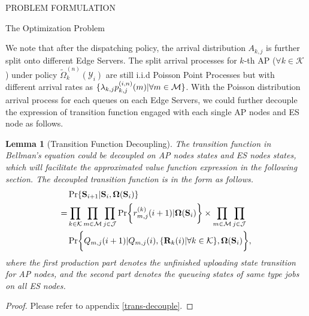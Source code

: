 \documentclass[10pt, conference, letterpaper]{IEEEtran}
\newtheorem{lemma}{Lemma}
\newcommand{\define}{\triangleq}
\newcommand{\vecG}{\boldsymbol}
\renewcommand{\vec}{\mathbf}
\DeclarePairedDelimiter{\set}{\{}{\}}
\DeclarePairedDelimiter{\Bracket}{\bigg[}{\bigg]}
\DeclarePairedDelimiter{\Brace}{\bigg\{}{\bigg\}}
\newcommand{\apSet}{\mathcal{K}}
\newcommand{\esSet}{\mathcal{M}}
\newcommand{\jSpace}{\mathcal{J}}
\newcommand{\Stat}{\mathbf{S}}
\newcommand{\Obsv}{\mathcal{Y}}
\newcommand{\Policy}{\boldsymbol{\Omega}}
\newcommand{\BPolicy}{\Policy} %
\begin{document}
\begin{section}{PROBLEM FORMULATION}
\begin{subsection}{The Optimization Problem}
            
            We note that after the dispatching policy, the arrival distribution $A_{k,j}$ is further split onto different Edge Servers. The split arrival processes for $k$-th AP ($\forall k\in\apSet$) under policy $\tilde{\Omega}^{(n)}_{k}(\Obsv_i)$ are still i.i.d Poisson Point Processes but with different arrival rates as $\set{\lambda_{k,j}p^{(i,n)}_{k,j}(m)|\forall m\in\esSet}$.
            With the Poisson distribution arrival process for each queues on each Edge Servers, we could further decouple the expression of transition function engaged with each single AP nodes and ES node as follows.
            \begin{lemma}[Transition Function Decoupling]
                The transition function in Bellman's equation could be decoupled on AP nodes states and ES nodes states, which will facilitate the approximated value function expression in the following section. The decoupled transition function is in the form as follows.
                \begin{align}
                    & \Pr\{\Stat_{i+1}|\Stat_{i}, \BPolicy(\Stat_{i})\}
                    \nonumber\\
                    =& \prod_{k\in\apSet}\prod_{m\in\esSet}\prod_{j\in\jSpace}
                            \Pr\Brace{r^{(k)}_{m,j}(i+1)|\BPolicy(\Stat_{i})}
                            \times \prod_{m\in\esSet}\prod_{j\in\jSpace}
                        \nonumber\\
                        & \Pr\Brace{Q_{m,j}(i+1)|Q_{m,j}(i), \set{\vec{R}_k(i)|\forall k\in\apSet}, \BPolicy(\Stat_{i})},
                \end{align}
                where the first production part denotes the unfinished uploading state transition for AP nodes, and the second part denotes the queueing states of same type jobs on all ES nodes.
            \end{lemma}
            \begin{proof}
                Please refer to appendix \ref{trans-decouple}.
            \end{proof}


\end{subsection}
\end{section}
\end{document}
